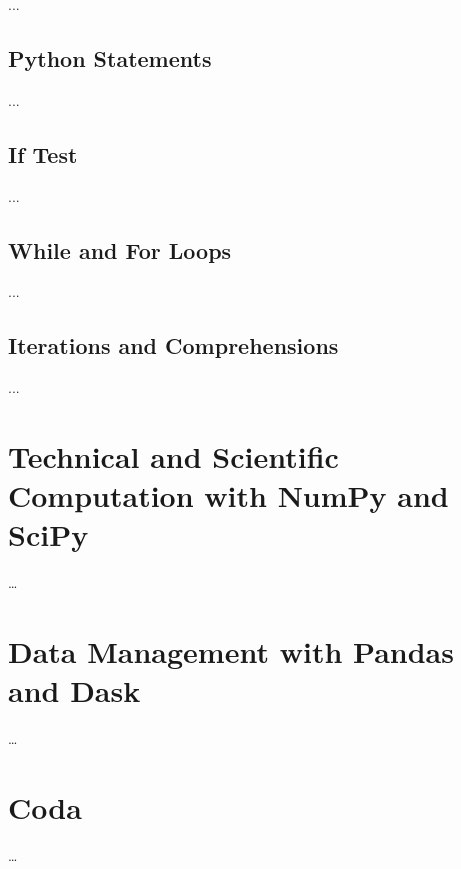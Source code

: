 \documentclass[a4paper,11pt]{book}
\begin{document}
...


\section{Python Statements}

...

\section{If Test}

...

\section{While and For Loops}

...

\section{Iterations and Comprehensions}

...


\theendnotes

\chapter{Technical and Scientific Computation with NumPy and SciPy}

\ldots

\chapter{Data Management with Pandas and Dask}

\ldots

\chapter{Coda}
\ldots
\end{document}
